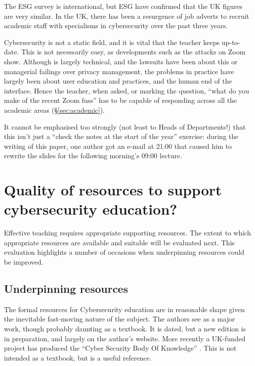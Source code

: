 \documentclass[conference]{IEEEtran}
\begin{document}
The ESG survey is international, but ESG have confirmed that the UK figures are very similar. In the UK, there has been a resurgence of job adverts to recruit academic staff with specialisms in cybersecurity over the past three years.

Cybersecurity is not a static field, and it is vital that the teacher keeps up-to-date. This is not necessarily easy, as developments such as the attacks on Zoom \cite[etc.]{MarczakScottRailton2020a} show. Although \cite{MarczakScottRailton2020a} is largely technical, and the lawsuits \cite[etc.]{Dame2020b} have been about this or managerial failings over privacy management, the problems in practice \cite{Abrams2020a,Culafi2020e} have largely been about user education and practices, and the human end of the interface. Hence the teacher, when asked, or marking the question, ``what do you make of the recent Zoom fuss'' has to be capable of responding across all the academic areas (\S\ref{sec:academic}). 

It cannot be emphasised too strongly (not least to Heads of Departments!) that this isn't just a ``check the notes at the start of the year'' exercise: during the writing of this paper, one author %
got an e-mail at 21:00 that caused him to rewrite the slides for the following morning's 09:00 lecture.


\section{Quality of resources to support cybersecurity education?}
Effective teaching requires appropriate supporting resources. The extent to which appropriate resources are available and suitable will be evaluated next. This evaluation highlights a number of occasions when underpinning resources could be improved. 
\subsection{Underpinning resources}
The formal resources for Cybersecurity education are in reasonable shape given the inevitable fast-moving nature of the subject. The authors see \cite{Anderson2008} as a major work, though probably daunting as a textbook. It is dated, but a new edition is in preparation, and largely on the author's website. More recently a UK-funded project has produced the ``Cyber Security Body Of Knowledge'' \cite{Bristol2019a}. This is not intended as a textbook, but is a useful reference.
\end{document}
